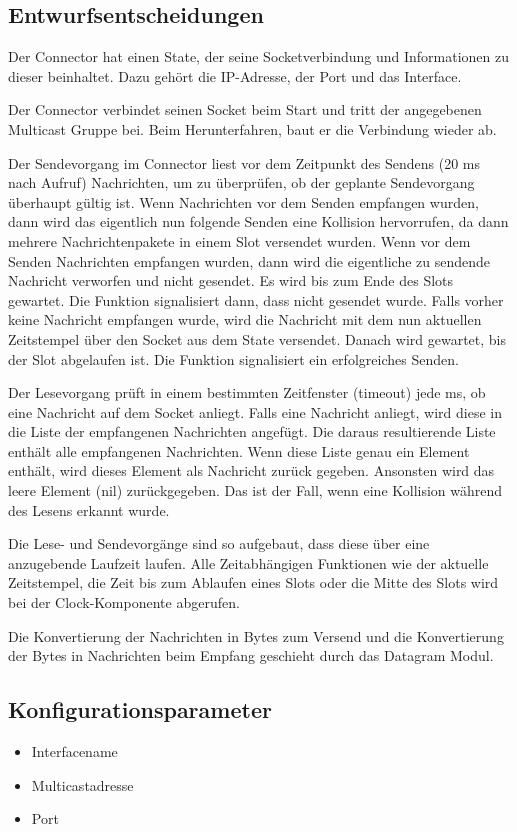 \documentclass[draft=false
              ,paper=a4
              ,twoside=false
              ,fontsize=11pt
              ,headsepline
              ,BCOR10mm
              ,DIV11
              ]{scrbook}
\begin{document}
\subsection{Entwurfsentscheidungen}
Der Connector hat einen State, der seine Socketverbindung und Informationen zu dieser beinhaltet. Dazu gehört die IP-Adresse, der Port und das Interface.

Der Connector verbindet seinen Socket beim Start und tritt der angegebenen Multicast Gruppe bei. Beim Herunterfahren, baut er die Verbindung wieder ab.

Der Sendevorgang im Connector liest vor dem Zeitpunkt des Sendens (20 ms nach Aufruf) Nachrichten, um zu überprüfen, ob der geplante Sendevorgang überhaupt gültig ist. Wenn Nachrichten vor dem Senden empfangen wurden, dann wird das eigentlich nun folgende Senden eine Kollision hervorrufen, da dann mehrere Nachrichtenpakete in einem Slot versendet wurden.
Wenn vor dem Senden Nachrichten empfangen wurden, dann wird die eigentliche zu sendende Nachricht verworfen und nicht gesendet. Es wird bis zum Ende des Slots gewartet. Die Funktion signalisiert dann, dass nicht gesendet wurde.
Falls vorher keine Nachricht empfangen wurde, wird die Nachricht mit dem nun aktuellen Zeitstempel über den Socket aus dem State versendet. Danach wird gewartet, bis der Slot abgelaufen ist. Die Funktion signalisiert ein erfolgreiches Senden.

Der Lesevorgang prüft in einem bestimmten Zeitfenster (timeout) jede ms, ob eine Nachricht auf dem Socket anliegt. Falls eine Nachricht anliegt, wird diese in die Liste der empfangenen Nachrichten angefügt. Die daraus resultierende Liste enthält alle empfangenen Nachrichten. Wenn diese Liste genau ein Element enthält, wird dieses Element als Nachricht zurück gegeben. Ansonsten wird das leere Element (nil) zurückgegeben. Das ist der Fall, wenn eine Kollision während des Lesens erkannt wurde.

Die Lese- und Sendevorgänge sind so aufgebaut, dass diese über eine anzugebende Laufzeit laufen. Alle Zeitabhängigen Funktionen wie der aktuelle Zeitstempel, die Zeit bis zum Ablaufen eines Slots oder die Mitte des Slots wird bei der Clock-Komponente abgerufen.

Die Konvertierung der Nachrichten in Bytes zum Versend und die Konvertierung der Bytes in Nachrichten beim Empfang geschieht durch das Datagram Modul.

\subsection{Konfigurationsparameter}
\begin{itemize}
	\item Interfacename
	\item Multicastadresse
	\item Port
\end{itemize}
\end{document}
